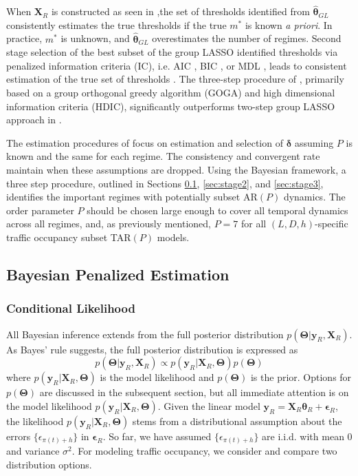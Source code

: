 When $\bm{X}_R$ is constructed as seen in \cite{Chan2015},the set of thresholds identified from $\hat{\bm{\theta}}_{GL}$ consistently estimates the true thresholds if the true $m^*$ is known \textit{a priori}. In practice, $m^*$ is unknown, and $\hat{\bm{\theta}}_{GL}$ overestimates the number of regimes. Second stage selection of the best subset of the group LASSO identified thresholds via penalized information criteria (IC), i.e. AIC \citep{Li2012}, BIC \citep{Yao1988}, or MDL \citep{Davis2006}, leads to consistent estimation of the true set of thresholds \citep{Chan2015}. The three-step procedure of \cite{Chan2017}, primarily based on a group orthogonal greedy algorithm (GOGA) and high dimensional information criteria (HDIC), significantly outperforms two-step group LASSO approach in \cite{Chan2015}.

The estimation procedures of \cite{Chan2015,Chan2017} focus on estimation and selection of $\bm{\delta}$ assuming $P$ is known and the same for each regime. The consistency and convergent rate maintain when these assumptions are dropped. Using the Bayesian framework, a three step procedure, outlined in Sections \ref{sec:stage1}, \ref{sec:stage2}, and \ref{sec:stage3}, identifies the important regimes with potentially subset AR$(P)$ dynamics. The order parameter $P$ should be chosen large enough to cover all temporal dynamics across all regimes, and, as previously mentioned, $P=7$ for all $(L,D,h)$-specific traffic occupancy subset TAR$(P)$ models.

\subsection{Bayesian Penalized Estimation}
\label{sec:stage1}

\subsubsection{Conditional Likelihood}
All Bayesian inference extends from the full posterior distribution $p(\bm{\Theta}|\bm{y}_R,\bm{X}_R)$. As Bayes' rule suggests, the full posterior distribution is expressed as
\begin{equation}
\label{eq:fullpost}
p(\bm{\Theta}|\bm{y}_R,\bm{X}_R) \propto p(\bm{y}_R|\bm{X}_R,\bm{\Theta})p(\bm{\Theta})
\end{equation}
where $p(\bm{y}_R|\bm{X}_R,\bm{\Theta})$ is the model likelihood and $p(\bm{\Theta})$ is the prior. Options for $p(\bm{\Theta})$ are discussed in the subsequent section, but all immediate attention is on the model likelihood $p(\bm{y}_R|\bm{X}_R,\bm{\Theta})$. Given the linear model $\bm{y}_R=\bm{X}_R\bm{\theta}_R+\bm{\epsilon}_R$, the likelihood $p(\bm{y}_R|\bm{X}_R,\bm{\Theta})$ stems from a distributional assumption about the errors $\{\epsilon_{\pi(t)+h}\}$ in $\bm{\epsilon}_R$. So far, we have assumed $\{\epsilon_{\pi(t)+h}\}$ are i.i.d. with mean $0$ and variance $\sigma^2$. For modeling traffic occupancy, we consider and compare two distribution options.

